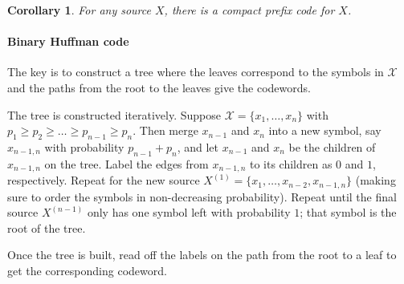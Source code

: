 \documentclass[a4paper, 11pt]{article}
\numberwithin{equation}{section}
\theoremstyle{plain}
\newtheorem{corollary}	[equation]	{Corollary}
\theoremstyle{definition}
\begin{document}
\begin{corollary}
For any source $X$, there is a compact prefix code for $X$.
\end{corollary}


\paragraph{Binary Huffman code}


The key is to construct a tree where the leaves correspond to the symbols in  $\mathcal{X}$ and the paths from the root to the leaves give the codewords.

The tree is constructed iteratively. Suppose $\mathcal{X} = \{x_1, \dots, x_n\}$ with $p_1 \ge p_2 \ge  \dots \ge p_{n-1} \ge p_n$. Then merge $x_{n-1}$ and $x_n$ into a new symbol, say $x_{n-1, n}$ with probability $p_{n-1} + p_n$, and let $x_{n-1}$ and $x_n$ be the children of $x_{n-1, n}$ on the tree. Label the edges from $x_{n-1, n}$ to its children as $0$ and $1$, respectively. Repeat for the new source $X^{(1)} = \{x_1, \dots, x_{n-2}, x_{n-1, n} \}$ (making sure to order the symbols in non-decreasing probability). Repeat until the final source $X^{(n-1)}$ only has one symbol left with probability $1$; that symbol is the root of the tree. 

Once the tree is built, read off the labels on the path from the root to a leaf to get the corresponding codeword.
\end{document}
